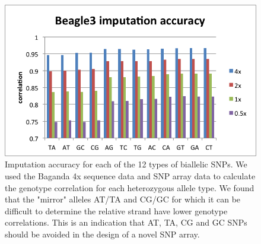 \begin{figure}[htp]
\centering
\includegraphics{fig/imp_accu_allele}
\caption[Imputation accuracy for each of the 12 types of biallelic SNPs.]{Imputation accuracy for each of the 12 types of biallelic SNPs. We used the Baganda 4x sequence data and SNP array data to calculate the genotype correlation for each heterozygous allele type. We found that the "mirror" alleles AT/TA and CG/GC for which it can be difficult to determine the relative strand have lower genotype correlations. This is an indication that AT, TA, CG and GC \glspl{SNP} should be avoided in the design of a novel SNP array.}
\label{fig:imp_accu_allele}
\end{figure}